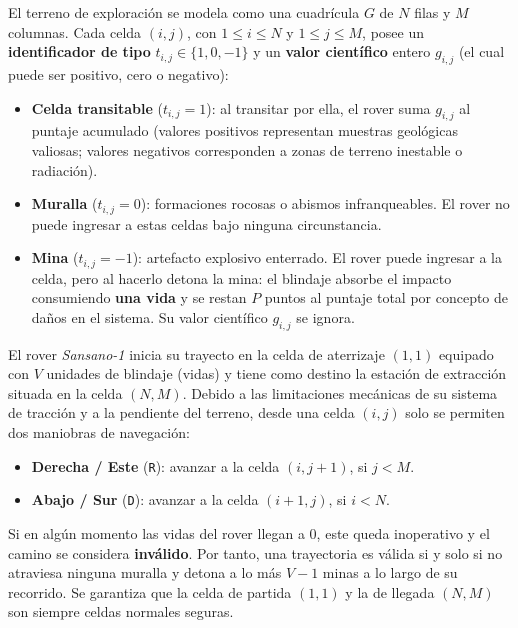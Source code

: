 
El terreno de exploración se modela como una cuadrícula $G$ de $N$ filas y $M$ columnas. Cada celda $(i,j)$, con $1 \leq i \leq N$ y $1 \leq j \leq M$, posee un \textbf{identificador de tipo} $t_{i,j} \in \{1, 0, -1\}$ y un \textbf{valor científico} entero $g_{i,j}$ (el cual puede ser positivo, cero o negativo):

\begin{itemize}
  \item \textbf{Celda transitable} ($t_{i,j} = 1$): al transitar por ella, el rover suma $g_{i,j}$ al puntaje acumulado (valores positivos representan muestras geológicas valiosas; valores negativos corresponden a zonas de terreno inestable o radiación).
  \item \textbf{Muralla} ($t_{i,j} = 0$): formaciones rocosas o abismos infranqueables. El rover no puede ingresar a estas celdas bajo ninguna circunstancia.
  \item \textbf{Mina} ($t_{i,j} = -1$): artefacto explosivo enterrado. El rover puede ingresar a la celda, pero al hacerlo detona la mina: el blindaje absorbe el impacto consumiendo \textbf{una vida} y se restan $P$ puntos al puntaje total por concepto de daños en el sistema. Su valor científico $g_{i,j}$ se ignora.
\end{itemize}

El rover \emph{Sansano-1} inicia su trayecto en la celda de aterrizaje $(1,1)$ equipado con $V$ unidades de blindaje (vidas) y tiene como destino la estación de extracción situada en la celda $(N,M)$. Debido a las limitaciones mecánicas de su sistema de tracción y a la pendiente del terreno, desde una celda $(i,j)$ solo se permiten dos maniobras de navegación:
\begin{itemize}
  \item \textbf{Derecha / Este} (\texttt{R}): avanzar a la celda $(i, j+1)$, si $j < M$.
  \item \textbf{Abajo / Sur} (\texttt{D}): avanzar a la celda $(i+1, j)$, si $i < N$.
\end{itemize}

Si en algún momento las vidas del rover llegan a $0$, este queda inoperativo y el camino se considera \textbf{inválido}. Por tanto, una trayectoria es válida si y solo si no atraviesa ninguna muralla y detona a lo más $V-1$ minas a lo largo de su recorrido. Se garantiza que la celda de partida $(1,1)$ y la de llegada $(N,M)$ son siempre celdas normales seguras.

